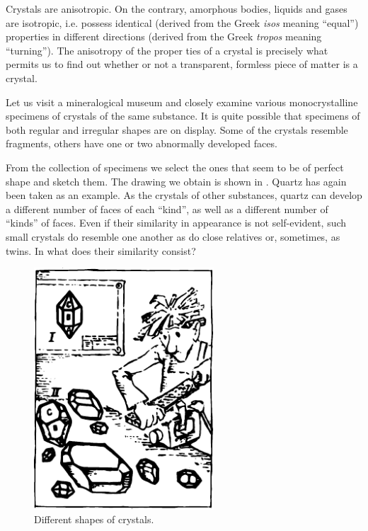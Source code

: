 Crystals are anisotropic. On the contrary, amorphous bodies, liquids and gases are isotropic, i.e. possess iden­tical (derived from the Greek \emph{isos} meaning ``equal'') properties in different directions (derived from the Greek \emph{tropos} meaning ``turning''). The anisotropy of the proper­ ties of a crystal is precisely what permits us to find out whether or not a transparent, formless piece of matter
is a crystal.

Let us visit a mineralogical museum and closely exam­ine various monocrystalline specimens of crystals of the same substance. It is quite possible that specimens of both regular and irregular shapes are on display. Some of the crystals resemble fragments, others have one or two abnormally developed faces.

From the collection of specimens we select the ones that seem to be of perfect shape and sketch them. The drawing we obtain is shown in . Quartz has again been taken as an example. As the crystals of other substances, quartz can develop a different number of faces of each ``kind'', as well as a different number of ``kinds'' of faces. Even if their similarity in appearance is not self-evident, such small crystals do resemble one another as do close relatives or, sometimes, as twins. In what does their similarity consist?

\begin{figure}[!ht]
\centering
\includegraphics[width=0.6\textwidth]{figures/fig-02-06.pdf}
\caption{Different shapes of crystals.}
\label{fig-2.6}
\end{figure}

